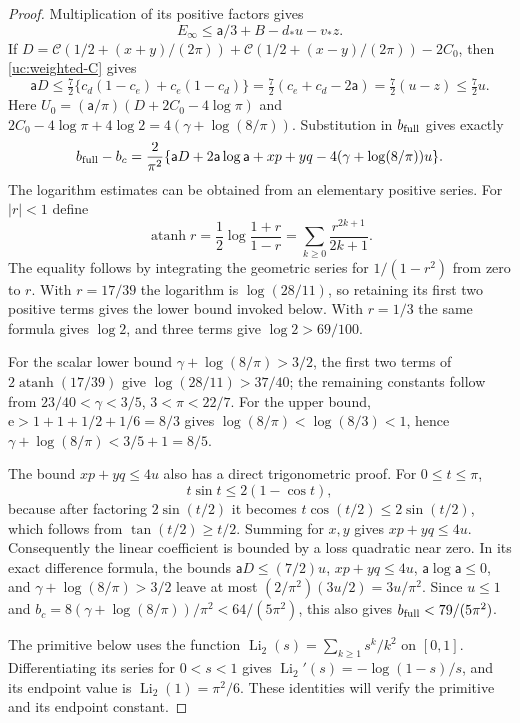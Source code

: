 \begin{proof}
Multiplication of its positive factors gives
\begin{equation}\label{uc:endpoint-loss}
 E_\infty\leq \mathsf{a}/3+B-d_*u-v_*z.
\end{equation}
If $D=\mathcal C(1/2+(x+y)/(2\pi))+
\mathcal C(1/2+(x-y)/(2\pi))-2C_0$, then \eqref{uc:weighted-C} gives
\[
 \mathsf aD\leq\tfrac72\{c_d(1-c_e)+c_e(1-c_d)\}
 =\tfrac72(c_e+c_d-2\mathsf a)=\tfrac72(u-z)\leq\tfrac72u.
\]
Here $U_0=(\mathsf a/\pi)(D+2C_0-4\log\pi)$ and
$2C_0-4\log\pi+4\log2=4(\gamma+\log(8/\pi))$.
Substitution in $b_{\rm full}$ gives exactly
\[
 b_{\rm full}-b_c=\frac2{\pi^2}
 \{\mathsf{a}D+2\mathsf{a}\log \mathsf{a}+xp+yq-4(\gamma+\log(8/\pi))u\}.
\]
The logarithm estimates can be obtained from an elementary positive
series. For $|r|<1$ define
\[
 \operatorname{atanh}r=\frac12\log\frac{1+r}{1-r}
 =\sum_{k\geq0}\frac{r^{2k+1}}{2k+1}.
\]
The equality follows by integrating the geometric series for
$1/(1-r^2)$ from zero to $r$. With $r=17/39$ the logarithm is
$\log(28/11)$, so retaining its first two positive terms gives the
lower bound invoked below. With $r=1/3$ the same formula gives
$\log2$, and three terms give $\log2>69/100$.

For the scalar lower bound $\gamma+\log(8/\pi)>3/2$, the first two
terms of $2\operatorname{atanh}(17/39)$ give
$\log(28/11)>37/40$; the remaining constants follow from
$23/40<\gamma<3/5$, $3<\pi<22/7$.
For the upper bound, $\mathrm e>1+1+1/2+1/6=8/3$ gives
$\log(8/\pi)<\log(8/3)<1$, hence
$\gamma+\log(8/\pi)<3/5+1=8/5$.

The bound $xp+yq\leq4u$ also has a direct trigonometric proof.
For $0\leq t\leq\pi$,
\[
 t\sin t\leq2(1-\cos t),
\]
because after factoring $2\sin(t/2)$ it becomes
$t\cos(t/2)\leq2\sin(t/2)$, which follows from
$\tan(t/2)\geq t/2$. Summing for $x,y$ gives $xp+yq\leq4u$.
Consequently the linear coefficient is bounded by a loss quadratic
near zero. In its exact difference formula, the bounds
$\mathsf{a}D\leq(7/2)u$, $xp+yq\leq4u$, $\mathsf{a}\log \mathsf{a}\leq0$, and
$\gamma+\log(8/\pi)>3/2$ leave at most
$(2/\pi^2)(3u/2)=3u/\pi^2$.
Since $u\leq1$ and
$b_c=8(\gamma+\log(8/\pi))/\pi^2<64/(5\pi^2)$, this also gives
$b_{\rm full}<79/(5\pi^2)$.

The primitive below uses the function
$\operatorname{Li}_2(s)=\sum_{k\geq1}s^k/k^2$ on $[0,1]$.
Differentiating its series for $0<s<1$ gives
$\operatorname{Li}_2'(s)=-\log(1-s)/s$, and its endpoint value
is $\operatorname{Li}_2(1)=\pi^2/6$. These identities will verify
the primitive and its endpoint constant.


\end{proof}
